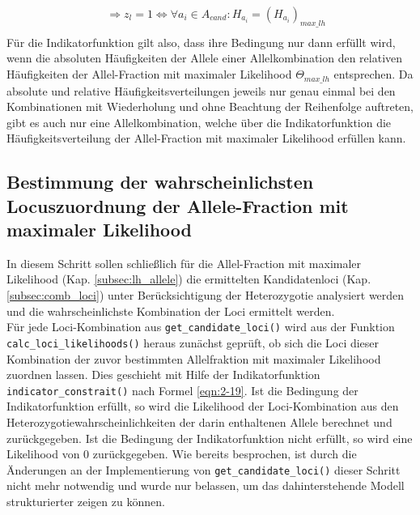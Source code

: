 \begin{center}
{{\begin{beweis}
\begin{equation}
\begin{aligned}
				&\ \Rightarrow z_{l} = 1 \Leftrightarrow \forall a_{i} \in A_{cand} : H_{a_{i}} = (H_{a_{i}})_{max\_lh} \\
				\end{aligned}
				\end{equation}
				Für die Indikatorfunktion gilt also, dass ihre Bedingung nur dann erfüllt wird, wenn die absoluten Häufigkeiten der Allele einer Allelkombination den relativen Häufigkeiten der Allel-Fraction mit maximaler Likelihood $ \Theta_{max\_lh} $ entsprechen. Da absolute und relative Häufigkeitsverteilungen jeweils nur genau einmal bei den Kombinationen mit Wiederholung und ohne Beachtung der Reihenfolge auftreten, gibt es auch nur eine Allelkombination, welche über die Indikatorfunktion die Häufigkeitsverteilung der Allel-Fraction mit maximaler Likelihood erfüllen kann.
			\end{beweis}
	}}
\end{center}

\subsection{Bestimmung der wahrscheinlichsten Locuszuordnung der Allele-Fraction mit maximaler Likelihood} \label{subsec:lh_loci}

In diesem Schritt sollen schließlich für die Allel-Fraction mit maximaler Likelihood (Kap. \ref{subsec:lh_allele}) die ermittelten Kandidatenloci (Kap. \ref{subsec:comb_loci}) unter Berücksichtigung der Heterozygotie analysiert werden und die wahrscheinlichste Kombination der Loci ermittelt werden.\\

Für jede Loci-Kombination aus \lstinline|get_candidate_loci()| wird aus der Funktion \linebreak \lstinline|calc_loci_likelihoods()| heraus zunächst geprüft, ob sich die Loci dieser Kombination der zuvor bestimmten Allelfraktion mit maximaler Likelihood zuordnen lassen. Dies geschieht mit Hilfe der Indikatorfunktion \lstinline|indicator_constrait()| nach Formel \eqref{eqn:2-19}. Ist die Bedingung der Indikatorfunktion erfüllt, so wird die Likelihood der Loci-Kombination aus den Heterozygotiewahrscheinlichkeiten der darin enthaltenen Allele berechnet und zurückgegeben. Ist die Bedingung der Indikatorfunktion nicht erfüllt, so wird eine Likelihood von 0 zurückgegeben. Wie bereits besprochen, ist durch die Änderungen an der Implementierung von \lstinline|get_candidate_loci()| dieser Schritt nicht mehr notwendig und wurde nur belassen, um das dahinterstehende Modell strukturierter zeigen zu können.\\


